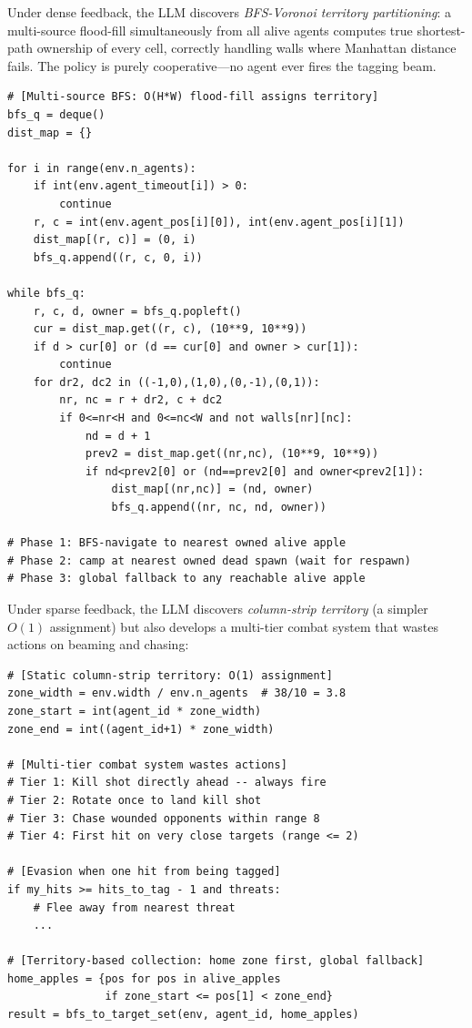 \documentclass{nextgame2026} %
\begin{document}
Under dense feedback, the LLM discovers \emph{BFS-Voronoi territory
partitioning}: a multi-source flood-fill simultaneously from all alive
agents computes true shortest-path ownership of every cell, correctly
handling walls where Manhattan distance fails.  The policy is purely
cooperative---no agent ever fires the tagging beam.

\begin{lstlisting}[style=pysmall, caption={Gathering --- dense feedback (BFS-Voronoi, zero aggression).}]
# [Multi-source BFS: O(H*W) flood-fill assigns territory]
bfs_q = deque()
dist_map = {}

for i in range(env.n_agents):
    if int(env.agent_timeout[i]) > 0:
        continue
    r, c = int(env.agent_pos[i][0]), int(env.agent_pos[i][1])
    dist_map[(r, c)] = (0, i)
    bfs_q.append((r, c, 0, i))

while bfs_q:
    r, c, d, owner = bfs_q.popleft()
    cur = dist_map.get((r, c), (10**9, 10**9))
    if d > cur[0] or (d == cur[0] and owner > cur[1]):
        continue
    for dr2, dc2 in ((-1,0),(1,0),(0,-1),(0,1)):
        nr, nc = r + dr2, c + dc2
        if 0<=nr<H and 0<=nc<W and not walls[nr][nc]:
            nd = d + 1
            prev2 = dist_map.get((nr,nc), (10**9, 10**9))
            if nd<prev2[0] or (nd==prev2[0] and owner<prev2[1]):
                dist_map[(nr,nc)] = (nd, owner)
                bfs_q.append((nr, nc, nd, owner))

# Phase 1: BFS-navigate to nearest owned alive apple
# Phase 2: camp at nearest owned dead spawn (wait for respawn)
# Phase 3: global fallback to any reachable alive apple
\end{lstlisting}

Under sparse feedback, the LLM discovers \emph{column-strip territory}
(a simpler $O(1)$ assignment) but also develops a multi-tier combat system
that wastes actions on beaming and chasing:

\begin{lstlisting}[style=pysmall, caption={Gathering --- sparse feedback (column strips + combat tiers).}]
# [Static column-strip territory: O(1) assignment]
zone_width = env.width / env.n_agents  # 38/10 = 3.8
zone_start = int(agent_id * zone_width)
zone_end = int((agent_id+1) * zone_width)

# [Multi-tier combat system wastes actions]
# Tier 1: Kill shot directly ahead -- always fire
# Tier 2: Rotate once to land kill shot
# Tier 3: Chase wounded opponents within range 8
# Tier 4: First hit on very close targets (range <= 2)

# [Evasion when one hit from being tagged]
if my_hits >= hits_to_tag - 1 and threats:
    # Flee away from nearest threat
    ...

# [Territory-based collection: home zone first, global fallback]
home_apples = {pos for pos in alive_apples
               if zone_start <= pos[1] < zone_end}
result = bfs_to_target_set(env, agent_id, home_apples)
\end{lstlisting}
\end{document}

